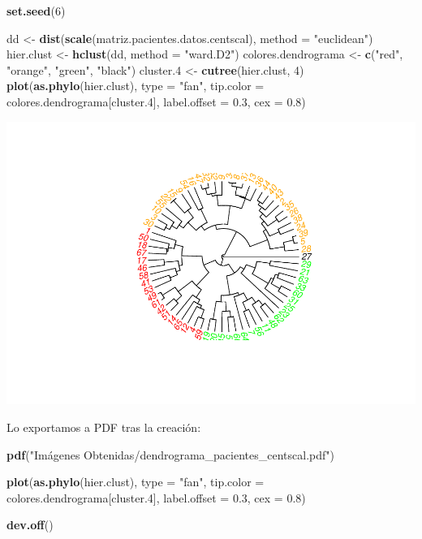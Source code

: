 \documentclass[]{article}
\newenvironment{Shaded}{\begin{snugshade}}{\end{snugshade}}
\newcommand{\DataTypeTok}[1]{\textcolor[rgb]{0.13,0.29,0.53}{#1}}
\newcommand{\DecValTok}[1]{\textcolor[rgb]{0.00,0.00,0.81}{#1}}
\newcommand{\FloatTok}[1]{\textcolor[rgb]{0.00,0.00,0.81}{#1}}
\newcommand{\KeywordTok}[1]{\textcolor[rgb]{0.13,0.29,0.53}{\textbf{#1}}}
\newcommand{\NormalTok}[1]{#1}
\newcommand{\StringTok}[1]{\textcolor[rgb]{0.31,0.60,0.02}{#1}}
\begin{document}
\begin{Shaded}
\begin{Highlighting}[]
\KeywordTok{set.seed}\NormalTok{(}\DecValTok{6}\NormalTok{)}

\NormalTok{dd <-}\StringTok{ }\KeywordTok{dist}\NormalTok{(}\KeywordTok{scale}\NormalTok{(matriz.pacientes.datos.centscal), }\DataTypeTok{method =} \StringTok{"euclidean"}\NormalTok{)}
\NormalTok{hier.clust <-}\StringTok{ }\KeywordTok{hclust}\NormalTok{(dd, }\DataTypeTok{method =} \StringTok{"ward.D2"}\NormalTok{)}
\NormalTok{colores.dendrograma <-}\StringTok{ }\KeywordTok{c}\NormalTok{(}\StringTok{"red"}\NormalTok{, }\StringTok{"orange"}\NormalTok{, }\StringTok{"green"}\NormalTok{, }\StringTok{"black"}\NormalTok{)}
\NormalTok{cluster}\FloatTok{.4}\NormalTok{ <-}\StringTok{ }\KeywordTok{cutree}\NormalTok{(hier.clust, }\DecValTok{4}\NormalTok{)}
\KeywordTok{plot}\NormalTok{(}\KeywordTok{as.phylo}\NormalTok{(hier.clust), }\DataTypeTok{type =} \StringTok{"fan"}\NormalTok{, }\DataTypeTok{tip.color =}\NormalTok{ colores.dendrograma[cluster}\FloatTok{.4}\NormalTok{], }\DataTypeTok{label.offset =} \FloatTok{0.3}\NormalTok{, }\DataTypeTok{cex =} \FloatTok{0.8}\NormalTok{)}
\end{Highlighting}
\end{Shaded}

\includegraphics{codigo_files/figure-latex/creacion_clusters_dendrograma_centradoEscalado-1.pdf}

Lo exportamos a PDF tras la creación:

\begin{Shaded}
\begin{Highlighting}[]
\KeywordTok{pdf}\NormalTok{(}\StringTok{"Imágenes Obtenidas/dendrograma_pacientes_centscal.pdf"}\NormalTok{)}

\KeywordTok{plot}\NormalTok{(}\KeywordTok{as.phylo}\NormalTok{(hier.clust), }\DataTypeTok{type =} \StringTok{"fan"}\NormalTok{, }\DataTypeTok{tip.color =}\NormalTok{ colores.dendrograma[cluster}\FloatTok{.4}\NormalTok{], }\DataTypeTok{label.offset =} \FloatTok{0.3}\NormalTok{, }\DataTypeTok{cex =} \FloatTok{0.8}\NormalTok{)}

\KeywordTok{dev.off}\NormalTok{()}
\end{Highlighting}
\end{Shaded}
\end{document}
